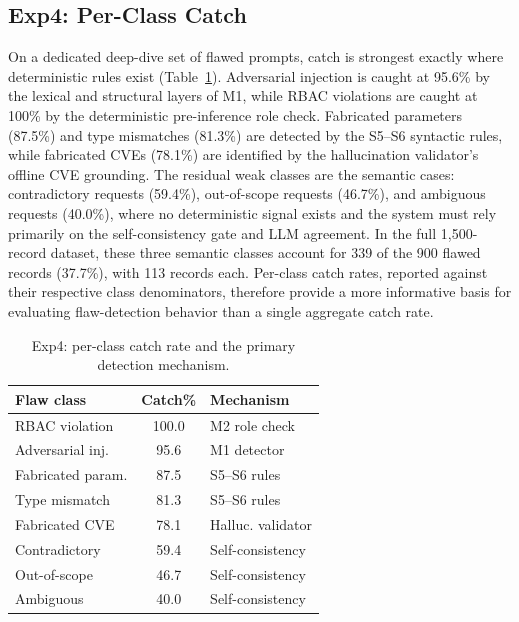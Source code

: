 \documentclass[a4paper,twoside]{article}
\begin{document}
\subsection{Exp4: Per-Class Catch}

\noindent On a dedicated deep-dive set of flawed prompts, catch is strongest exactly where deterministic rules exist (Table~\ref{tab:perclass}). Adversarial injection is caught at 95.6\% by the lexical and structural layers of M1, while RBAC violations are caught at 100\% by the deterministic pre-inference role check. Fabricated parameters (87.5\%) and type mismatches (81.3\%) are detected by the S5--S6 syntactic rules, while fabricated CVEs (78.1\%) are identified by the hallucination validator's offline CVE grounding. The residual weak classes are the semantic cases: contradictory requests (59.4\%), out-of-scope requests (46.7\%), and ambiguous requests (40.0\%), where no deterministic signal exists and the system must rely primarily on the self-consistency gate and LLM agreement. In the full 1,500-record dataset, these three semantic classes account for 339 of the 900 flawed records (37.7\%), with 113 records each. Per-class catch rates, reported against their respective class denominators, therefore provide a more informative basis for evaluating flaw-detection behavior than a single aggregate catch rate.

\begin{table}[h]
\caption{Exp4: per-class catch rate and the primary detection mechanism.}\label{tab:perclass}
\centering
\small
\begin{tabular}{|l|c|l|}
  \hline
  Flaw class & Catch\% & Mechanism \\
  \hline
  RBAC violation      & 100.0 & M2 role check \\
  Adversarial inj.    & 95.6  & M1 detector \\
  Fabricated param.   & 87.5  & S5--S6 rules \\
  Type mismatch       & 81.3  & S5--S6 rules \\
  Fabricated CVE      & 78.1  & Halluc. validator \\
  Contradictory       & 59.4  & Self-consistency \\
  Out-of-scope        & 46.7  & Self-consistency \\
  Ambiguous           & 40.0  & Self-consistency \\
  \hline
\end{tabular}
\end{table}
\end{document}
